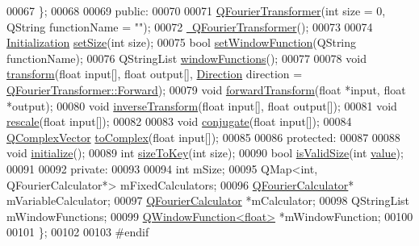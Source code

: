 \begin{DoxyCode}
00067         \};
00068 
00069     \textcolor{keyword}{public}:
00070 
00071         \hyperlink{a00054_a87498c4b95128ec0052d31a87e97a9b9}{QFourierTransformer}(\textcolor{keywordtype}{int} size = 0, QString functionName = \textcolor{stringliteral}{""});
00072         \hyperlink{a00054_a04c4f72887461f5951332b9cac7bef13}{~QFourierTransformer}();
00073 
00074         \hyperlink{a00054_aeb481656565bc92ec7b2f3e9d5d883c3}{Initialization} \hyperlink{a00054_aab762683a5ed505ed7be906c4340cb07}{setSize}(\textcolor{keywordtype}{int} size);
00075         \textcolor{keywordtype}{bool} \hyperlink{a00054_a8c8f0a2101aba7f6da70050c7ebdc36c}{setWindowFunction}(QString functionName);
00076         QStringList \hyperlink{a00054_a61125fbf2b312c745d71fe8bdd3f2d26}{windowFunctions}();
00077 
00078         \textcolor{keywordtype}{void} \hyperlink{a00054_ac86e9f35cd5313def6ef3c2bede56919}{transform}(\textcolor{keywordtype}{float} input[], \textcolor{keywordtype}{float} output[], \hyperlink{a00054_a54933cee8b4d5f692b2a085b3b671f12}{Direction} direction = 
      \hyperlink{a00054_a54933cee8b4d5f692b2a085b3b671f12ad0c3ac33a7682d25b54133a6442966d1}{QFourierTransformer::Forward});
00079         \textcolor{keywordtype}{void} \hyperlink{a00054_a02bee79c9e9f978ed1fb012eda58ed5d}{forwardTransform}(\textcolor{keywordtype}{float} *input, \textcolor{keywordtype}{float} *output);
00080         \textcolor{keywordtype}{void} \hyperlink{a00054_a5af8ceccf2bbe0a37be994db7181a4ca}{inverseTransform}(\textcolor{keywordtype}{float} input[], \textcolor{keywordtype}{float} output[]);
00081         \textcolor{keywordtype}{void} \hyperlink{a00054_ad5e366c27b75fff9b1997673f4cb4510}{rescale}(\textcolor{keywordtype}{float} input[]);
00082 
00083         \textcolor{keywordtype}{void} \hyperlink{a00054_a23874623179dfd2b9684856f0b2f9f25}{conjugate}(\textcolor{keywordtype}{float} input[]);
00084         \hyperlink{a00122_a3f6b3838bd0d647c7fe12093694e5c5e}{QComplexVector} \hyperlink{a00054_af3c641ac46b1fdd78a0b390daae9859c}{toComplex}(\textcolor{keywordtype}{float} input[]);
00085 
00086     \textcolor{keyword}{protected}:
00087 
00088         \textcolor{keywordtype}{void} \hyperlink{a00054_a050f813673ba678aefeeafba415c82aa}{initialize}();
00089         \textcolor{keywordtype}{int} \hyperlink{a00054_ae8918e95cfd4b0b65bae0947903918ac}{sizeToKey}(\textcolor{keywordtype}{int} size);
00090         \textcolor{keywordtype}{bool} \hyperlink{a00054_ac6ce59f26c2e51bc91f16ba42cf059a4}{isValidSize}(\textcolor{keywordtype}{int} \hyperlink{a00116_aee90379adb0307effb138f4871edbc5c}{value});
00091 
00092     \textcolor{keyword}{private}:
00093 
00094         \textcolor{keywordtype}{int} mSize;
00095         QMap<int, QFourierCalculator*> mFixedCalculators;
00096         \hyperlink{a00052}{QFourierCalculator}* mVariableCalculator;
00097         \hyperlink{a00052}{QFourierCalculator} *mCalculator;
00098         QStringList mWindowFunctions;
00099         \hyperlink{a00071}{QWindowFunction<float>} *mWindowFunction;
00100 
00101 \};
00102 
00103 \textcolor{preprocessor}{#endif}
\end{DoxyCode}
